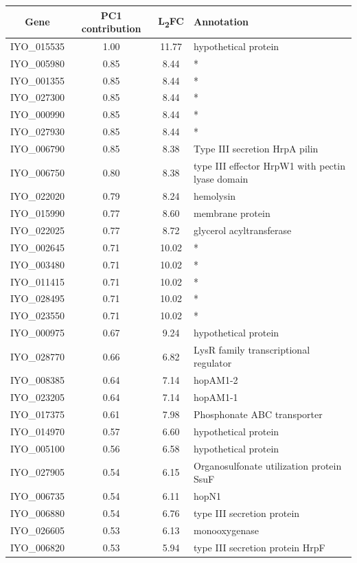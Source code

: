 \begin{table}[H]
    \centering
    \begin{tabular}{cccl}\toprule
Gene & PC1 contribution & L\textsubscript{2}FC & Annotation \\\midrule
IYO_015535 & 1.00 & 11.77 & hypothetical protein\\
IYO_005980 & 0.85 & 8.44 & *\\
IYO_001355	& 0.85	& 8.44	& * \\
IYO_027300	& 0.85	& 8.44	& * \\
IYO_000990	& 0.85	& 8.44	& * \\
IYO_027930	& 0.85	& 8.44	& * \\
IYO_006790	& 0.85	& 8.38	& Type III secretion HrpA pilin\\
IYO_006750	& 0.80	& 8.38	& type III effector HrpW1 with pectin lyase domain\\
IYO_022020	& 0.79	& 8.24	& hemolysin\\
IYO_015990	& 0.77	& 8.60	& membrane protein\\
IYO_022025	& 0.77	& 8.72	& glycerol acyltransferase\\
IYO_002645	& 0.71	& 10.02	& * \\
IYO_003480	& 0.71	& 10.02	& * \\
IYO_011415	& 0.71	& 10.02	& * \\
IYO_028495	& 0.71	& 10.02	& * \\
IYO_023550	& 0.71	& 10.02	& * \\
IYO_000975	& 0.67	& 9.24	& hypothetical protein \\
IYO_028770	& 0.66	& 6.82	& LysR family transcriptional regulator \\
IYO_008385	& 0.64	& 7.14	& hopAM1-2 \\
IYO_023205	& 0.64	& 7.14	& hopAM1-1 \\
IYO_017375	& 0.61	& 7.98	& Phosphonate ABC transporter \\
IYO_014970	& 0.57	& 6.60	& hypothetical protein \\
IYO_005100	& 0.56	& 6.58	& hypothetical protein \\
IYO_027905	& 0.54	& 6.15	& Organosulfonate utilization protein SsuF \\
IYO_006735	& 0.54	& 6.11	& hopN1 \\
IYO_006880	& 0.54	& 6.76	& type III secretion protein \\
IYO_026605	& 0.53&	6.13	& monooxygenase \\
IYO_006820	& 0.53	& 5.94	& type III secretion protein HrpF \\

\end{tabular}
\end{table}
